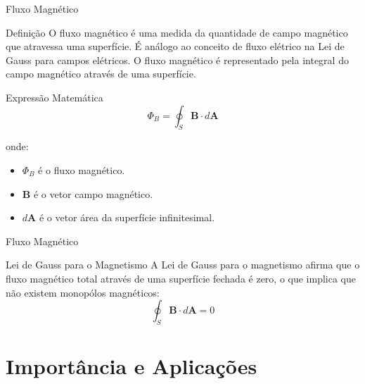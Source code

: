 \documentclass{beamer}
\begin{document}
  \begin{frame}{Fluxo Magnético}
    \begin{block}{Definição}
    O fluxo magnético é uma medida da quantidade de campo magnético que atravessa uma superfície. É análogo ao conceito de fluxo elétrico na Lei de Gauss para campos elétricos. O fluxo magnético é representado pela integral do campo magnético através de uma superfície.
    \end{block}
    \begin{block}{Expressão Matemática}
      \[
      \Phi_B = \oint_S \mathbf{B} \cdot d\mathbf{A}
      \]
    \end{block}
    onde:
    \begin{itemize}
        \item $\Phi_B$ é o fluxo magnético.
        \item $\mathbf{B}$ é o vetor campo magnético.
        \item $d\mathbf{A}$ é o vetor área da superfície infinitesimal.
    \end{itemize}
  \end{frame}

  \begin{frame}{Fluxo Magnético}    
    \begin{block}{Lei de Gauss para o Magnetismo}
    A Lei de Gauss para o magnetismo afirma que o fluxo magnético total através de uma superfície fechada é zero, o que implica que não existem monopólos magnéticos:
    \[
    \oint_S \mathbf{B} \cdot d\mathbf{A} = 0
    \]
    \end{block}
    
  \end{frame}
  
  \section{Importância e Aplicações}
  
\end{document}
